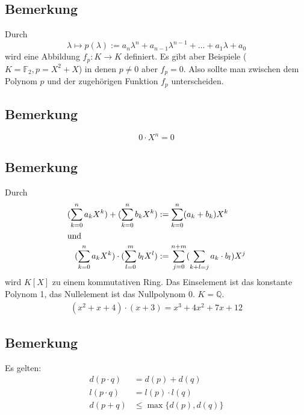 \subsection[Bemerkung über die von einem Polynom definierte Funktion]{Bemerkung} %
\label{sub:42}
Durch 
\[
	\lambda \mapsto p(\lambda ) := a_n \lambda^n + a_{n-1} \lambda^{n-1} + \ldots + a_1 \lambda + a_0
\]
wird eine Abbildung $f_p : K \to K$ definiert. Es gibt aber Beispiele ($K= \mathds{F}_2 , p= X^2+X$) in denen $p \not= 0$ aber $f_p=0$.
Also sollte man zwischen dem Polynom $p$ und der zugehörigen Funktion $f_p$ unterscheiden.

\subsection[Berkung über das Multiplizieren mit Null \ldots]{Bemerkung} %
\label{sub:43}
\[
	0 \cdot X^n = 0
\]

\subsection[Bemerkung über den Polynomring]{Bemerkung} %
\label{sub:44}
Durch 
\begin{align*}
	( \sum_{k=0}^{n} a_k X^k) + (\sum_{k=0}^{n} b_k X^k) &:= \sum_{k=0}^{n} (a_k + b_k) X^k  \\
	\intertext{und}
	( \sum_{k=0}^{n} a_k X^k) \cdot (\sum_{l=0}^{m} b_l X^l) &:= \sum_{j=0}^{n+m} (\sum_{k+l=j}^{} a_k \cdot b_l)  X^j
\end{align*}
wird $K[X]$ zu einem kommutativen Ring. Das Einselement ist das konstante Polynom 1, das Nullelement ist das Nullpolynom 0.
$K=\mathds{Q}$.
\begin{align*}
	(x^2+x+4)\cdot (x+3)= x^3+4x^2+7x+12
\end{align*}

\subsection[Bemerkung über Rechenregeln mit dem Grad eines Polynoms]{Bemerkung} %
\label{sub:45}
Es gelten:
\begin{align*}
	d(p \cdot q	) &= d(p) + d(q) \tag{sogar für $p=0$ oder $q=0$}\\
	l(p \cdot q) &= l(p) \cdot l(q) \\
	d(p+q) &\le \max \{ d(p), d(q) \}
\end{align*}

